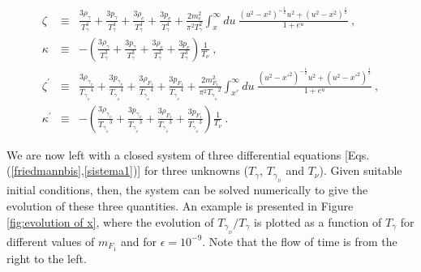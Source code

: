 \documentclass[12pt]{article}
\begin{document}
\begin{eqnarray}
\zeta & \equiv &  \frac{3\rho _{\gamma}}{T _{\gamma} ^4} + \frac{3p
_{\gamma}}{T _{\gamma} ^4} + \frac{3\rho _e}{T _{\gamma} ^4} + \frac{3p
_e}{T _{\gamma} ^4} + \frac{2m _{e} ^2}{\pi ^2 T _{\gamma} ^2} \int _{x}
^{\infty} du \ \frac{(u^2 - x^2)^{-\frac{1}{2}} u^2 + (u^2 -
x^2)^{\frac{1}{2}}}{1 + e^u} \ , \nonumber \\
\kappa & \equiv & - \left ( \frac{3\rho _{\gamma}}{T _{\gamma} ^3} +
\frac{3p _{\gamma}}{T _{\gamma} ^3} + \frac{3\rho _e}{T _{\gamma} ^3} +
\frac{3p _e}{T _{\gamma} ^3} \right ) \frac{1}{T _{\nu}} \ , \nonumber
\\
\zeta ^{'} & \equiv & \frac{3\rho _{\gamma _{_D}}}{{T _{\gamma _{_D}}}
^4} + \frac{3p _{\gamma _{_D}}}{{T _{\gamma _{_D}}}^4} + \frac{3\rho
_{F_1}}{{T _{\gamma _{_D}}} ^4} + \frac{3p _{F_1}}{{T _{\gamma _{_D}}}
^4} + \frac{2m _{F_1} ^2}{\pi ^2 {T _{\gamma _{_D}}} ^2} \int _{x'}
^{\infty} du \ \frac{(u^2 - {x'}^2)^{-\frac{1}{2}} u^2 + (u^2 -
{x'}^2)^{\frac{1}{2}}}{1 + e^u} \ , \nonumber \\
\kappa ^{'} & \equiv & - \left ( \frac{3\rho _{\gamma _{_D}}}{{T
_{\gamma _{_D}}}^3} + \frac{3p _{\gamma _{_D}}}{{T _{\gamma _{_D}}} ^3}
+ \frac{3\rho _{F_1}}{{T _{\gamma _{_D}}} ^3} + \frac{3p _{F_1}}{{T
_{\gamma _{_D}}} ^3} \right ) \frac{1}{T _{\nu}} \ .
\label{sistemo}
\end{eqnarray}
%

We are now left with a closed system of three differential equations
[Eqs.(\ref{friedmannbis},\ref{sistema1})] for three unknowns ($T
_{\gamma}$, $T _{\gamma _{_D}}$ and $T _{\nu}$). Given suitable initial
conditions, then, the system can be solved numerically to give the
evolution of these three quantities. An example is presented in Figure
\ref{fig:evolution of x}, where the evolution of $T _{\gamma _{_D}}/T
_{\gamma}$ is plotted as a function of $T _{\gamma}$ for different
values of $m _{F_1}$ and for $\epsilon = 10 ^{-9}$. Note that the flow
of time is from the right to the left.
\end{document}
